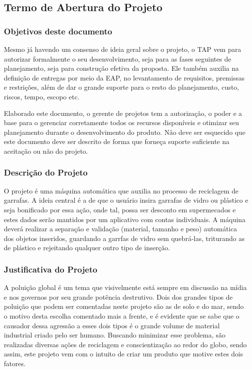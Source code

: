 \begin{apendicesenv}

\partapendices

\chapter{Termo de Abertura do Projeto}

\subsection{Objetivos deste documento}

Mesmo já havendo um consenso de ideia geral sobre o projeto, o TAP vem para autorizar formalmente o seu desenvolvimento, seja para as fases seguintes de planejamento, seja para construção efetiva da proposta. Ele também auxilia na definição de entregas por meio da EAP, no levantamento de requisitos, premissas e restrições, além de dar o grande suporte para o resto do planejamento, custo, riscos, tempo, escopo etc.

Elaborado este documento, o gerente de projetos tem a autorização, o poder e a base para o gerenciar corretamente todos os recursos disponíveis e otimizar seu planejamento durante o desenvolvimento do produto. Não deve ser esquecido que este documento deve ser descrito de forma que forneça suporte suficiente na aceitação ou não do projeto.


\subsection{Descrição do Projeto}

O projeto é uma máquina automática que auxilia no processo de reciclagem de garrafas. A ideia central é a de que o usuário insira garrafas de vidro ou plástico e seja bonificado por essa ação, onde tal, possa ser desconto em supermecados e estes dados serão mantidos por um aplicativo com contas individuais. A máquina deverá realizar a separação e validação (material, tamanho e peso) automática dos objetos inseridos, guardando a garrfas de vidro sem quebrá-las, triturando as de plástico e rejeitando qualquer outro tipo de inserção.

\subsection{Justificativa do Projeto}

A poluição global é um tema que visivelmente está sempre em discussão na mídia e nos governos por seu grande potência destrutivo. Dois dos grandes tipos de poluição que podem ser comentadas neste projeto são as de solo e do mar, sendo o motivo desta escolha comentado mais a frente, e é evidente que se sabe que o causador dessa agressão a esses dois tipos é o grande volume de material industrial criado pelo ser humano. Buscando minimizar esse problema, são realizadas diversas ações de reciclagem e conscientização ao redor do globo, sendo assim, este projeto vem com o intuito de criar um produto que motive estes dois fatores.


\end{apendicesenv}
